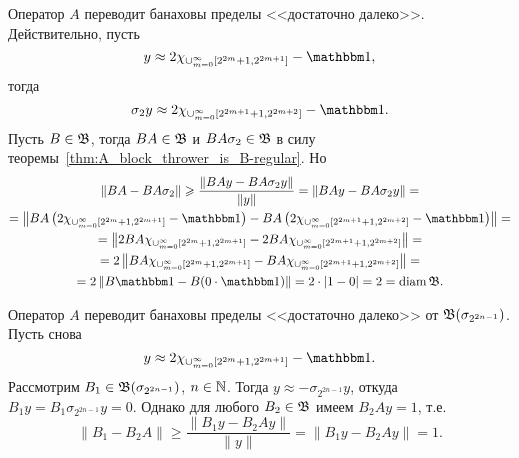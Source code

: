 \begin{remark}
	Оператор $A$ переводит банаховы пределы <<достаточно далеко>>. Действительно, пусть
	\begin{equation}
		y \approx 2\chi_{\cup_{m=0}^{\infty}\left[2^{2 m}+1, 2^{2 m+1}\right]} - \one
		,
	\end{equation}
	тогда
	\begin{equation}
		\sigma_2 y \approx 2\chi_{\cup_{m=0}^{\infty}\left[2^{2 m+1}+1, 2^{2 m+2}\right]} - \one
		.
	\end{equation}
	Пусть $B\in\mathfrak{B}$, тогда $BA\in\mathfrak{B}$ и $BA\sigma_2\in\mathfrak{B}$ в силу теоремы~\ref{thm:A_block_thrower_is_B-regular}.
	Но
	\begin{multline}
		\|BA-BA\sigma_2\| \geq \dfrac{\| BAy-BA\sigma_2y \|}{\|y\|} = \| BAy-BA\sigma_2y \| =
		\\=
		\left\| BA\left(2\chi_{\cup_{m=0}^{\infty}\left[2^{2 m}+1, 2^{2 m+1}\right]} - \one\right)-
		BA\left(2\chi_{\cup_{m=0}^{\infty}\left[2^{2 m+1}+1, 2^{2 m+2}\right]} - \one\right) \right\|=
		\\=
		\left\| 2BA\chi_{\cup_{m=0}^{\infty}\left[2^{2 m}+1, 2^{2 m+1}\right]}-
		2BA\chi_{\cup_{m=0}^{\infty}\left[2^{2 m+1}+1, 2^{2 m+2}\right]}  \right\|=
		\\=
		2\left\| BA\chi_{\cup_{m=0}^{\infty}\left[2^{2 m}+1, 2^{2 m+1}\right]}-
		BA\chi_{\cup_{m=0}^{\infty}\left[2^{2 m+1}+1, 2^{2 m+2}\right]}  \right\|=
		\\=
		2\left\| B \one- B (0\cdot \one)  \right\|=
		2\cdot| 1- 0  |= 2 = \diam \B
		.
		\end{multline}
\end{remark}

\begin{remark}
	Оператор $A$ переводит банаховы пределы <<достаточно далеко>> от $\mathfrak{B}(\sigma_{2^{2n-1}})$.
	Пусть снова
	\begin{equation}
		y \approx 2\chi_{\cup_{m=0}^{\infty}\left[2^{2 m}+1, 2^{2 m+1}\right]} - \one
		.
	\end{equation}
	Рассмотрим $B_1 \in \mathfrak{B}(\sigma_{2^{2n-1}})$, $n\in\mathbb{N}$.
	Тогда  $y \approx - \sigma_{2^{2n-1}} y$,
	откуда $B_1 y = B_1 \sigma_{2^{2n-1}} y = 0$.
	Однако для любого $B_2 \in \mathfrak{B}$ имеем $B_2 A y = 1$,
	т.е.
	\begin{equation}
		\|B_1 - B_2 A\| \geq \dfrac{\|B_1y - B_2 Ay\|}{\|y\|} = \|B_1y - B_2 Ay\| = 1
		.
	\end{equation}
\end{remark}

